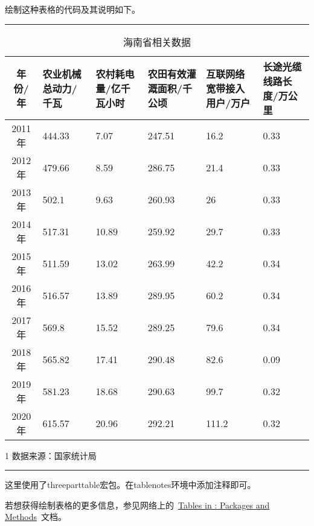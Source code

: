 绘制这种表格的代码及其说明如下。
\vspace{1em}\noindent\hrule
\begin{VerbWithBreak}
   \begin{table}[!ht]
      \caption{海南省相关数据}
      \vspace{0.5em}\centering\wuhao
      \begin{threeparttable}
      \begin{tabularx}{\textwidth}{c*5{X<{\centering}}}
      \toprule[1.5pt]
      年份/年 & 农业机械总动力/千瓦 & 农村耗电量/亿千瓦小时 & 农田有效灌溉面积/千公顷 & 互联网络宽带接入用户/万户 & 长途光缆线路长度/万公里\\
      \midrule[1pt]
      2011年 & 444.33 & 7.07 & 247.51 & 16.2 & 0.33\\
      2012年 & 479.66 & 8.59 & 286.75 & 21.4 & 0.33\\
      2013年 & 502.1 & 9.63 & 260.93 & 26 & 0.33\\
      2014年 & 517.31 & 10.89 & 259.92 & 29.7 & 0.33\\
      2015年 & 511.59 & 13.02 & 263.99 & 42.2 & 0.34\\
      2016年 & 516.57 & 13.89 & 289.95 & 60.2 & 0.34\\
      2017年 & 569.8 & 15.52 & 289.25 & 79.6 & 0.34\\
      2018年 & 565.82 & 17.41 & 290.48 & 82.6 & 0.09\\
      2019年 & 581.23 & 18.68 & 290.63 & 99.7 & 0.32 \\
      2020年 & 615.57 & 20.96 & 292.21 & 111.2 & 0.32 \\
      \bottomrule[1.5pt]
      \end{tabularx}
      \begin{tablenotes}
          \footnotesize
          \item[1] 数据来源：国家统计局
      \end{tablenotes}
      \end{threeparttable}
      \vspace{\baselineskip}
   \end{table}
\end{VerbWithBreak}
   \noindent\hrule
\begin{VerbWithBreak}
   这里使用了threeparttable宏包。在tablenotes环境中添加注释即可。
\end{VerbWithBreak}

若想获得绘制表格的更多信息，参见网络上的~\href{http://www.tug.org/pracjourn/2007-1/mori/}{Tables in \LaTeXe: Packages and Methods}~文档。

